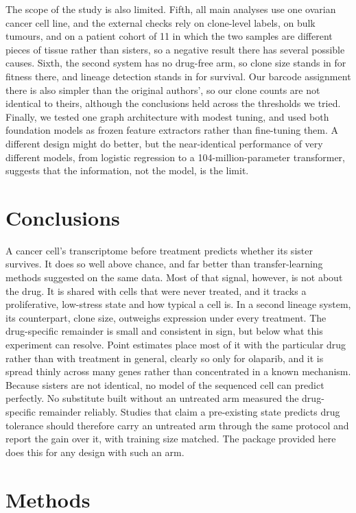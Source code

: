 \documentclass[11pt,a4paper]{article}
\begin{document}
The scope of the study is also limited. Fifth, all main analyses use one ovarian cancer cell line, and the external checks rely on clone-level labels, on bulk tumours, and on a patient cohort of 11 in which the two samples are different pieces of tissue rather than sisters, so a negative result there has several possible causes. Sixth, the second system has no drug-free arm, so clone size stands in for fitness there, and lineage detection stands in for survival. Our barcode assignment there is also simpler than the original authors', so our clone counts are not identical to theirs, although the conclusions held across the thresholds we tried. Finally, we tested one graph architecture with modest tuning, and used both foundation models as frozen feature extractors rather than fine-tuning them. A different design might do better, but the near-identical performance of very different models, from logistic regression to a 104-million-parameter transformer, suggests that the information, not the model, is the limit.

\section*{Conclusions}

A cancer cell's transcriptome before treatment predicts whether its sister survives. It does so well above chance, and far better than transfer-learning methods suggested on the same data. Most of that signal, however, is not about the drug. It is shared with cells that were never treated, and it tracks a proliferative, low-stress state and how typical a cell is. In a second lineage system, its counterpart, clone size, outweighs expression under every treatment. The drug-specific remainder is small and consistent in sign, but below what this experiment can resolve. Point estimates place most of it with the particular drug rather than with treatment in general, clearly so only for olaparib, and it is spread thinly across many genes rather than concentrated in a known mechanism. Because sisters are not identical, no model of the sequenced cell can predict perfectly. No substitute built without an untreated arm measured the drug-specific remainder reliably. Studies that claim a pre-existing state predicts drug tolerance should therefore carry an untreated arm through the same protocol and report the gain over it, with training size matched. The package provided here does this for any design with such an arm.

\section*{Methods}
\end{document}
